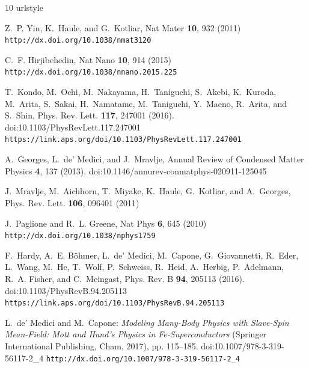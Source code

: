 \documentclass[12pt,twoside]{article}
\begin{document}
\clearpage
%
%
\begin{thebibliography}{10}
\providecommand{\url}[1]{\texttt{#1}}
\providecommand{\urlprefix}{}
\expandafter\ifx\csname urlstyle\endcsname\relax
  \providecommand{\doi}[1]{doi:\discretionary{}{}{}#1}\else
  \providecommand{\doi}{doi:\discretionary{}{}{}\begingroup
  \urlstyle{rm}\Url}\fi

Z.~P. Yin, K.~Haule, and G.~Kotliar, Nat Mater \textbf{10}, 932 (2011)
\newline\urlprefix\url{http://dx.doi.org/10.1038/nmat3120}

C.~F. Hirjibehedin, Nat Nano \textbf{10}, 914 (2015)
\newline\urlprefix\url{http://dx.doi.org/10.1038/nnano.2015.225}

T.~Kondo, M.~Ochi, M.~Nakayama, H.~Taniguchi, S.~Akebi, K.~Kuroda, M.~Arita,
  S.~Sakai, H.~Namatame, M.~Taniguchi, Y.~Maeno, R.~Arita, and S.~Shin, Phys.
  Rev. Lett. \textbf{117}, 247001 (2016).
\newblock \doi{10.1103/PhysRevLett.117.247001}
\newline\urlprefix\url{https://link.aps.org/doi/10.1103/PhysRevLett.117.247001}

A.~Georges, L.~de' Medici, and J.~Mravlje, Annual Review of Condensed Matter
  Physics \textbf{4}, 137 (2013).
\newblock \doi{10.1146/annurev-conmatphys-020911-125045}

J.~Mravlje, M.~Aichhorn, T.~Miyake, K.~Haule, G.~Kotliar, and A.~Georges, Phys.
  Rev. Lett. \textbf{106}, 096401 (2011)

J.~Paglione and R.~L. Greene, Nat Phys \textbf{6}, 645 (2010)
\newline\urlprefix\url{http://dx.doi.org/10.1038/nphys1759}

F.~Hardy, A.~E. B\"ohmer, L.~de' Medici, M.~Capone, G.~Giovannetti, R.~Eder,
  L.~Wang, M.~He, T.~Wolf, P.~Schweiss, R.~Heid, A.~Herbig, P.~Adelmann, R.~A.
  Fisher, and C.~Meingast, Phys. Rev. B \textbf{94}, 205113 (2016).
\newblock \doi{10.1103/PhysRevB.94.205113}
\newline\urlprefix\url{https://link.aps.org/doi/10.1103/PhysRevB.94.205113}

L.~de' Medici and M.~Capone: \emph{Modeling Many-Body Physics with Slave-Spin
  Mean-Field: Mott and Hund's Physics in Fe-Superconductors} (Springer
  International Publishing, Cham, 2017), pp. 115--185.
\newblock \doi{10.1007/978-3-319-56117-2_4}
\newline\urlprefix\url{http://dx.doi.org/10.1007/978-3-319-56117-2_4}


\end{thebibliography}
\end{document}
